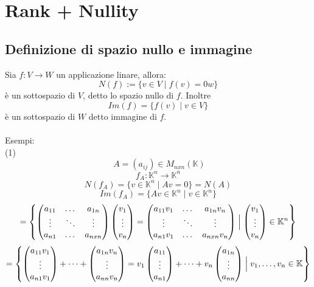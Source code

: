 \documentclass[12pt]{article}
\begin{document}
\section{Rank + Nullity}

\subsection{Definizione di spazio nullo e immagine}
Sia $f: V \rightarrow W$ un applicazione linare, allora:
\[N(f):= \{v \in V \mid f(v) = 0w\}\]
è un sottospazio di $V$, detto lo spazio nullo di $f$. Inoltre
\[Im(f) = \{f(v) \mid v \in V\}\]
è un sottospazio di $W$ detto immagine di $f$.
\\\\
Esempi: \\(1)
\[\; A = (a_{ij}) \in M_{nxn} (\mathbb{K})\]
\[f_A : \mathbb{K}^n \rightarrow \mathbb{K}^n\]
\[N(f_A) = \{v \in \mathbb{K}^n \mid Av = 0\} = N(A)\]
\[Im(f_A) = \{Av \in \mathbb{K}^n \mid v \in \mathbb{K}^n\}\]
\[= \left\{\begin{pmatrix}
    a_{11}&  \dots & a_{1n}\\
    \vdots & \ddots & \vdots\\
    a_{n1} & \dots & a_{nxn}
\end{pmatrix}\begin{pmatrix}
    v_1\\
    \vdots\\
    v_n
\end{pmatrix} = \begin{pmatrix}
    a_{11}v_1 &  \dots & a_{1n}v_n\\
    \vdots & \ddots & \vdots\\
    a_{n1}v_1 & \dots & a_{nxn}v_n
\end{pmatrix} \Bigm\vert \begin{pmatrix}
    v_1\\
    \vdots\\
    v_n
\end{pmatrix} \in \mathbb{K}^n\right\}\]
\[= \left\{\begin{pmatrix}
    a_{11}v_1\\
    \vdots\\
    a_{n1}v_1
\end{pmatrix} + \dots + \begin{pmatrix}
    a_{1n}v_n\\
    \vdots\\
    a_{nn}v_n
\end{pmatrix} = v_1 \begin{pmatrix}
    a_{11}\\
    \vdots\\
    a_{n1}
\end{pmatrix} + \dots + v_n \begin{pmatrix}
    a_{1n}\\
    \vdots\\
    a_{nn}
\end{pmatrix} \Bigm\vert v_1, \dots, v_n \in \mathbb{K}\right\}\]
\end{document}
